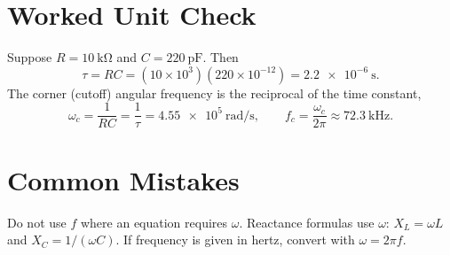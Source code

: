 \section{Worked Unit Check}
Suppose \(R=\SI{10}{\kilo\ohm}\) and \(C=\SI{220}{\pico\farad}\). Then
\[
\tau=RC=(10\times10^3)(220\times10^{-12})=\SI{2.2e-6}{\second}.
\]
The corner (cutoff) angular frequency is the reciprocal of the time constant,
\[
\omega_c=\frac{1}{RC}=\frac{1}{\tau}=\SI{4.55e5}{\radian\per\second},
\qquad
f_c=\frac{\omega_c}{2\pi}\approx \SI{72.3}{\kilo\hertz}.
\]

\section{Common Mistakes}
\begin{mistakebox}
Do not use \(f\) where an equation requires \(\omega\). Reactance formulas use
\(\omega\): \(X_L=\omega L\) and \(X_C=1/(\omega C)\). If frequency is given in
hertz, convert with \(\omega=2\pi f\).
\end{mistakebox}
